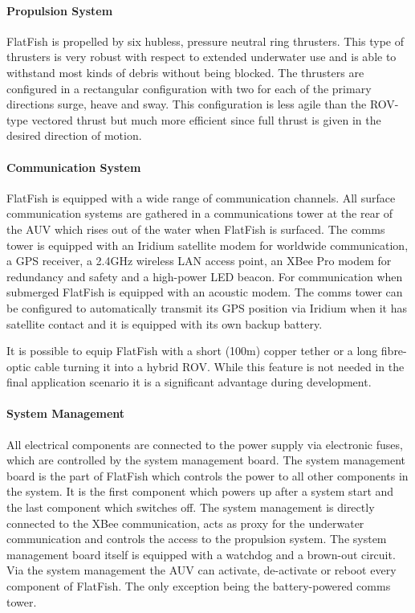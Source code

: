 \documentclass[conference]{IEEEtran}
\begin{document}
\paragraph{\textbf{Propulsion System}} FlatFish is propelled by six hubless, pressure neutral 
ring thrusters. This type of thrusters is very robust with respect to extended underwater use 
and is able to withstand most kinds of debris without being blocked. The thrusters are 
configured in a rectangular configuration with two for each of the primary directions 
surge, heave and sway. This configuration is less agile than the ROV-type vectored thrust but 
much more efficient since full thrust is given in the desired direction of motion.

\paragraph{\textbf{Communication System}} FlatFish is equipped with a wide range of 
communication channels. All surface communication systems are gathered in a 
communications tower at the rear of the AUV which rises out of 
the water when FlatFish is surfaced. The comms tower is equipped with an Iridium satellite 
modem for worldwide communication, a GPS receiver, a 2.4GHz wireless LAN access point, 
an XBee Pro modem for redundancy and safety and a high-power LED beacon. For 
communication when submerged FlatFish is equipped with an acoustic modem. The comms tower 
can be configured to automatically transmit its GPS position via Iridium when it has satellite 
contact and it is equipped with its own backup battery.

It is possible to equip FlatFish with a short (100m) copper tether or a long fibre-optic cable 
turning it into a hybrid ROV. While this feature is not needed in the final application 
scenario it is a significant advantage during development.

\paragraph{\textbf{System Management}} All electrical components are connected to the 
power supply via electronic fuses, which are controlled by the system management board. 
The system management board is the part of FlatFish which controls the power to all other 
components in the system. It is the first component which powers up after a system start 
and the last component which switches off. The system management is directly connected 
to the XBee communication, acts as proxy for the underwater communication and controls 
the access to the propulsion system. The system management board itself is equipped with 
a watchdog and a brown-out circuit. Via the system management the AUV can activate, 
de-activate or reboot every component of FlatFish. The only exception being the battery-powered comms tower. 
\end{document}
